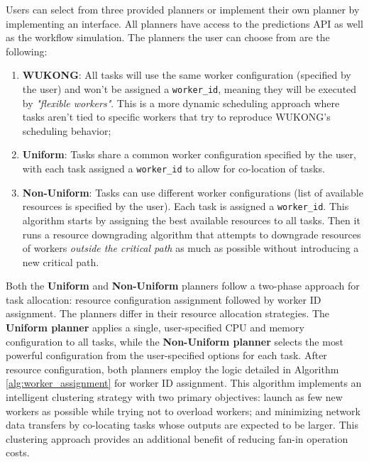 \documentclass[conference]{IEEEtran}
\begin{document}
Users can select from three provided planners or implement their own planner by implementing an interface. All planners have access to the predictions API as well as the workflow simulation. The planners the user can choose from are the following:

\begin{enumerate}
    \item \textbf{WUKONG}: All tasks will use the same worker configuration (specified by the user) and won't be assigned a \texttt{worker\_id}, meaning they will be executed by \textit{"flexible workers"}. This is a more dynamic scheduling approach where tasks aren't tied to specific workers that try to reproduce WUKONG's scheduling behavior;
    \item \textbf{Uniform}: Tasks share a common worker configuration specified by the user, with each task assigned a \texttt{worker\_id} to allow for co-location of tasks.
    \item \textbf{Non-Uniform}: Tasks can use different worker configurations (list of available resources is specified by the user). Each task is assigned a \texttt{worker\_id}. This algorithm starts by assigning the best available resources to all tasks. Then it runs a resource downgrading algorithm that attempts to downgrade resources of workers \textit{outside the critical path} as much as possible without introducing a new critical path.
\end{enumerate}

Both the \textbf{Uniform} and \textbf{Non-Uniform} planners follow a two-phase approach for task allocation: resource configuration assignment followed by worker ID assignment. The planners differ in their resource allocation strategies. The \textbf{Uniform planner} applies a single, user-specified CPU and memory configuration to all tasks, while the \textbf{Non-Uniform planner} selects the most powerful configuration from the user-specified options for each task. After resource configuration, both planners employ the logic detailed in Algorithm \ref{alg:worker_assignment} for worker ID assignment. This algorithm implements an intelligent clustering strategy with two primary objectives: launch as few new workers as possible while trying not to overload workers; and minimizing network data transfers by co-locating tasks whose outputs are expected to be larger. This clustering approach provides an additional benefit of reducing fan-in operation costs.
\end{document}
